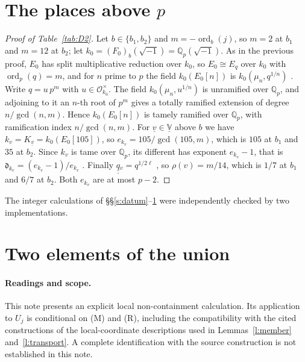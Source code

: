\documentclass[11pt]{amsart}
\theoremstyle{remark}
\newcommand{\Qp}{\mathbb Q_p}
\newcommand{\cO}{\mathcal O}
\newcommand{\dd}{\mathfrak d}
\newcommand{\qq}{\underline{\underline{q}}{}}
\newcommand{\VV}{\underline{\mathbb V}}
\begin{document}
\section{The places above \texorpdfstring{$p$}{p}}\label{s:local}

\begin{proof}[Proof of Table~\ref{tab:D2}]
Let $b\in\{b_1,b_2\}$ and $m=-\operatorname{ord}_b(j)$, so $m=2$ at $b_1$ and $m=12$ at $b_2$; let
$k_0=(F_0)_b(\sqrt{-1})=\Qp(\sqrt{-1})$. As in the previous proof, $E_0$ has split multiplicative reduction over
$k_0$, so $E_0\cong E_q$ over $k_0$ with $\operatorname{ord}_p(q)=m$, and for $n$ prime to $p$ the field
$k_0(E_0[n])$ is $k_0(\mu_n,q^{1/n})$ \cite[App.~C, Thm.~14.1, and the expansion $j=q^{-1}+744+\cdots$ on
p.~444]{Sil}. Write $q=u\,p^m$ with $u\in\cO_{k_0}^\times$. The field $k_0(\mu_n,u^{1/n})$ is unramified over
$\Qp$, and adjoining to it an $n$-th root of $p^m$ gives a totally ramified extension of degree $n/\gcd(n,m)$.
Hence $k_0(E_0[n])$ is tamely ramified over $\Qp$, with ramification index $n/\gcd(n,m)$. For $\underline v\in\VV$
above $b$ we have $k_v=K_{\underline v}=k_0(E_0[105])$, so $e_{k_v}=105/\gcd(105,m)$, which is $105$ at $b_1$ and
$35$ at $b_2$. Since $k_v$ is tame over $\Qp$, its different has exponent $e_{k_v}-1$, that is
$\dd_{k_v}=(e_{k_v}-1)/e_{k_v}$ \cite[Prop.~1.3(i), pp.~11--12]{IUT4}. Finally
$\qq_v=q^{1/2\ell}$ \cite[Ex.~3.2(iv), p.~71]{IUT1}, so $\rho(v)=m/14$, which is $1/7$ at $b_1$ and $6/7$ at
$b_2$. Both $e_{k_v}$ are at
most $p-2$.
\end{proof}

The integer calculations of \S\S\ref{s:datum}--\ref{s:local} were independently checked by two implementations.

\section{Two elements of the union}\label{s:union}

\paragraph{Readings and scope.}
This note presents an explicit local non-containment calculation.
Its application to $U_j$ is conditional on \textup{(M)} and \textup{(R)}, including
the compatibility with the cited constructions of the local-coordinate descriptions
used in Lemmas~\ref{l:member} and~\ref{l:transport}.
A complete identification with the source construction is not established in this note.
\end{document}
